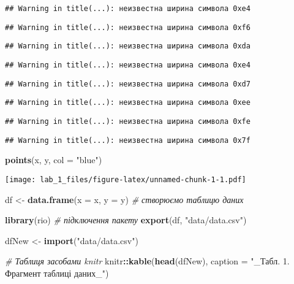 \documentclass[
  12pt,
]{article}
\newenvironment{Shaded}{\begin{snugshade}}{\end{snugshade}}
\newcommand{\AttributeTok}[1]{\textcolor[rgb]{0.13,0.29,0.53}{#1}}
\newcommand{\CommentTok}[1]{\textcolor[rgb]{0.56,0.35,0.01}{\textit{#1}}}
\newcommand{\FunctionTok}[1]{\textcolor[rgb]{0.13,0.29,0.53}{\textbf{#1}}}
\newcommand{\NormalTok}[1]{#1}
\newcommand{\OtherTok}[1]{\textcolor[rgb]{0.56,0.35,0.01}{#1}}
\newcommand{\SpecialCharTok}[1]{\textcolor[rgb]{0.81,0.36,0.00}{\textbf{#1}}}
\newcommand{\StringTok}[1]{\textcolor[rgb]{0.31,0.60,0.02}{#1}}
\begin{document}
\begin{verbatim}
## Warning in title(...): неизвестна ширина символа 0xe4
\end{verbatim}

\begin{verbatim}
## Warning in title(...): неизвестна ширина символа 0xf6
\end{verbatim}

\begin{verbatim}
## Warning in title(...): неизвестна ширина символа 0xda
\end{verbatim}

\begin{verbatim}
## Warning in title(...): неизвестна ширина символа 0xe4
\end{verbatim}

\begin{verbatim}
## Warning in title(...): неизвестна ширина символа 0xd7
\end{verbatim}

\begin{verbatim}
## Warning in title(...): неизвестна ширина символа 0xee
\end{verbatim}

\begin{verbatim}
## Warning in title(...): неизвестна ширина символа 0xfe
\end{verbatim}

\begin{verbatim}
## Warning in title(...): неизвестна ширина символа 0x7f
\end{verbatim}

\begin{Shaded}
\begin{Highlighting}[]
\FunctionTok{points}\NormalTok{(x, y,}
       \AttributeTok{col =} \StringTok{"blue"}\NormalTok{)}
\end{Highlighting}
\end{Shaded}

\texttt{[image: lab\_1\_files/figure-latex/unnamed-chunk-1-1.pdf]}

\begin{Shaded}
\begin{Highlighting}[]
\NormalTok{df }\OtherTok{\textless{}{-}} \FunctionTok{data.frame}\NormalTok{(}\AttributeTok{x =}\NormalTok{ x, }\AttributeTok{y =}\NormalTok{ y) }\CommentTok{\# створюємо таблицю даних}

\FunctionTok{library}\NormalTok{(rio) }\CommentTok{\# підключення пакету}
\FunctionTok{export}\NormalTok{(df, }\StringTok{"data/data.csv"}\NormalTok{)}

\NormalTok{dfNew }\OtherTok{\textless{}{-}}  \FunctionTok{import}\NormalTok{(}\StringTok{"data/data.csv"}\NormalTok{)}

\CommentTok{\# Таблиця засобами knitr}
\NormalTok{knitr}\SpecialCharTok{::}\FunctionTok{kable}\NormalTok{(}\FunctionTok{head}\NormalTok{(dfNew),}
             \AttributeTok{caption =} \StringTok{"\_Табл. 1. Фрагмент таблиці даних\_"}\NormalTok{)}
\end{Highlighting}
\end{Shaded}
\end{document}
